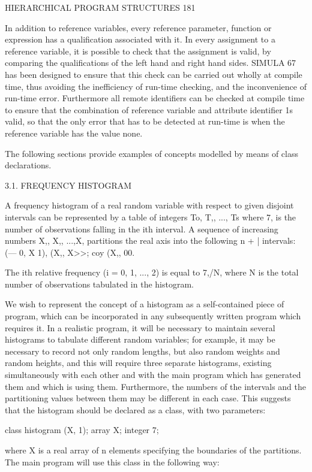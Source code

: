 HIERARCHICAL PROGRAM STRUCTURES 181

In addition to reference variables, every reference parameter, function or expression has a qualification associated with it. In every assignment to a reference variable, it is possible to check that the assignment is valid, by comparing the qualifications of the left hand and right hand sides. SIMULA 67 has been designed to ensure that this check can be carried out wholly at compile time, thus avoiding the inefficiency of run-time checking, and the inconvenience of run-time error. Furthermore all remote identifiers can be checked at compile time to ensure that the combination of reference variable and attribute identifier 1s valid, so that the only error that has to be detected at run-time is when the reference variable has the value none.

The following sections provide examples of concepts modelled by means of class declarations.

3.1. FREQUENCY HISTOGRAM

A frequency histogram of a real random variable with respect to given disjoint intervals can be represented by a table of integers To, T,, ..., Ts where 7, is the number of observations falling in the ith interval. A sequence of increasing numbers X,, X,, ...,X, partitions the real axis into the following n + | intervals: (— 0, X 1), (X,, X>>; coy (X,, 00.

The ith relative frequency (i = 0, 1, ..., 2) is equal to 7,/N, where N is the total number of observations tabulated in the histogram.

We wish to represent the concept of a histogram as a self-contained piece of program, which can be incorporated in any subsequently written program which requires it. In a realistic program, it will be necessary to maintain several histograms to tabulate different random variables; for example, it may be necessary to record not only random lengths, but also random weights and random heights, and this will require three separate histograms, existing simultaneously with each other and with the main program which has generated them and which is using them. Furthermore, the numbers of the intervals and the partitioning values between them may be different in each case. This suggests that the histogram should be declared as a class, with two parameters:

class histogram (X, 1); array X; integer 7;

where X is a real array of n elements specifying the boundaries of the partitions. The main program will use this class in the following way:

